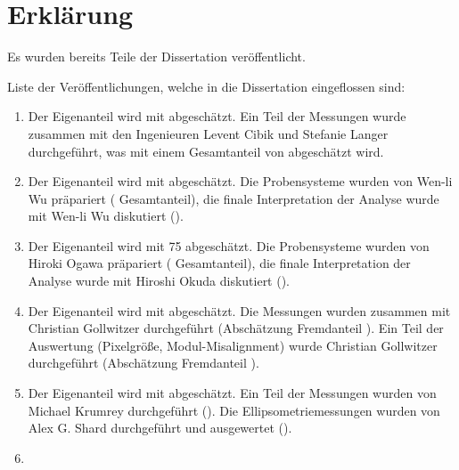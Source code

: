 \noindent
\pagestyle{empty}

\section*{Erklärung}

Es wurden bereits Teile der Dissertation veröffentlicht.
\vspace{2ex}

Liste der Veröffentlichungen, welche in die Dissertation eingeflossen sind:

\begin{enumerate}
    \item \cite{vicent_polymer_2006} 

        Der Eigenanteil wird mit  abgeschätzt.
        Ein Teil der Messungen wurde zusammen mit den Ingenieuren Levent Cibik und Stefanie Langer durchgeführt, was mit einem Gesamtanteil von  abgeschätzt wird.

    \item \cite{vicent_polymer_2006}

        Der Eigenanteil wird mit  abgeschätzt.
        Die Probensysteme wurden von Wen-li Wu präpariert ( Gesamtanteil), die finale Interpretation der Analyse wurde mit Wen-li Wu diskutiert ().

    \item \cite{vicent_polymer_2006}

        Der Eigenanteil wird mit 75 abgeschätzt.
        Die Probensysteme wurden von Hiroki Ogawa präpariert ( Gesamtanteil), die finale Interpretation der Analyse wurde mit Hiroshi Okuda diskutiert ().

    \item \cite{vicent_polymer_2006}

        Der Eigenanteil wird mit  abgeschätzt.
        Die Messungen wurden zusammen mit Christian Gollwitzer durchgeführt (Abschätzung Fremdanteil ).
        Ein Teil der Auswertung (Pixelgröße, Modul-Misalignment) wurde Christian Gollwitzer durchgeführt (Abschätzung Fremdanteil ).

    \item \cite{vicent_polymer_2006}

        Der Eigenanteil wird mit  abgeschätzt.
        Ein Teil der Messungen wurden von Michael Krumrey durchgeführt ().
        Die Ellipsometriemessungen wurden von Alex G. Shard durchgeführt und ausgewertet ().

    \item \cite{vicent_polymer_2006}


\end{enumerate}

